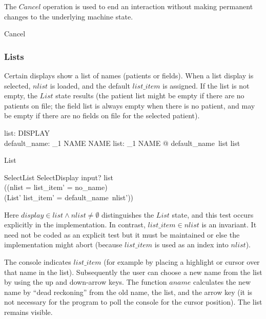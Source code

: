 The $Cancel$ operation is used to end an interaction without making
permanent changes to the underlying machine state.

\begin{zed} Cancel  \end{zed}

\subsubsection{Lists}

Certain displays show a list of names (patients or fields).  When a
list display is selected, $nlist$ is loaded, and the default $list\_item$
is assigned. If the list is not empty, the $List$ state results (the
patient list might be empty if there are no patients on file; the
field list is always empty when there is no patient, and may be empty
if there are no fields on file for the selected patient).

\begin{axdef}
	list: \power DISPLAY \\
	default\_name: \power_1 NAME \fun NAME 
\where 
	\forall list: \power_1 NAME @ default\_name~list \in list
\end{axdef}


\begin{zed} 
List 
\end{zed}

\begin{schema}{SelectList}
	SelectDisplay
\where
	input? \in list \\
	((nlist = \emptyset \land list\_item' = no\_name) \\
	\lor (List' \land list\_item' = default\_name~nlist'))
\end{schema}
Here $display \in list \land nlist \neq \emptyset$ distinguishes the
$List$ state, and this test occurs explicitly in the implementation.
In contrast, $list\_item \in nlist$ is an invariant.  It need not be
coded as an explicit test but it must be maintained or else the
implementation might abort (because $list\_item$ is used as an index
into $nlist$).

The console indicates $list\_item$ (for example by placing a highlight
or cursor over that name in the list).  Subsequently the user can
choose a new name from the list by using the up and down-arrow keys.
The function $aname$ calculates the new name by ``dead
reckoning'' from the old name, the list, and the arrow key (it is
not necessary for the program to poll the console for the cursor
position).  The list remains visible.

